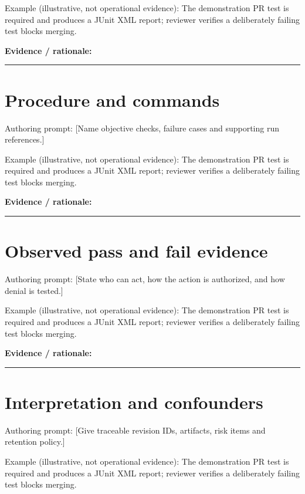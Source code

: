 \documentclass[11pt,letterpaper]{article}
\begin{document}
Example (illustrative, not operational evidence): The demonstration PR test is required and produces a JUnit XML report; reviewer verifies a deliberately failing test blocks merging.

\noindent\textbf{Evidence / rationale:}\par\nobreak\vspace{8pt}\noindent\rule{0.93\linewidth}{0.4pt}\par\vspace{14pt}
\section{Procedure and commands}
Authoring prompt: [Name objective checks, failure cases and supporting run references.]

Example (illustrative, not operational evidence): The demonstration PR test is required and produces a JUnit XML report; reviewer verifies a deliberately failing test blocks merging.

\noindent\textbf{Evidence / rationale:}\par\nobreak\vspace{8pt}\noindent\rule{0.93\linewidth}{0.4pt}\par\vspace{14pt}
\section{Observed pass and fail evidence}
Authoring prompt: [State who can act, how the action is authorized, and how denial is tested.]

Example (illustrative, not operational evidence): The demonstration PR test is required and produces a JUnit XML report; reviewer verifies a deliberately failing test blocks merging.

\noindent\textbf{Evidence / rationale:}\par\nobreak\vspace{8pt}\noindent\rule{0.93\linewidth}{0.4pt}\par\vspace{14pt}
\section{Interpretation and confounders}
Authoring prompt: [Give traceable revision IDs, artifacts, risk items and retention policy.]

Example (illustrative, not operational evidence): The demonstration PR test is required and produces a JUnit XML report; reviewer verifies a deliberately failing test blocks merging.
\end{document}
